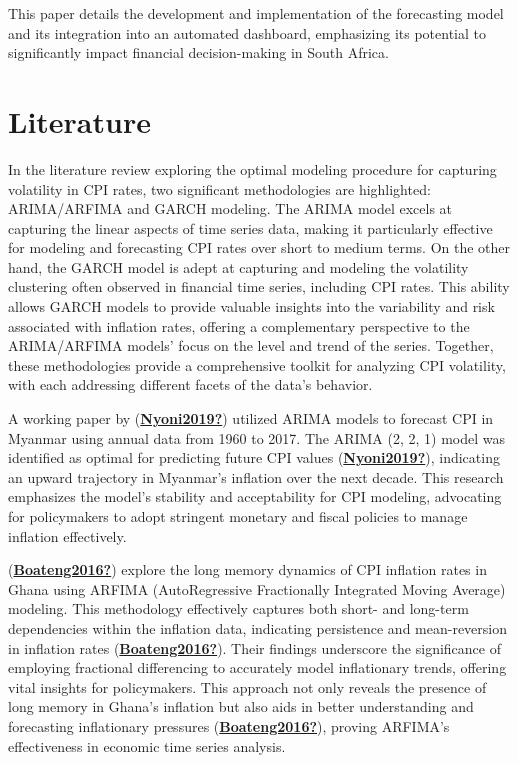 \documentclass[11pt,preprint, authoryear]{elsarticle}
\numberwithin{equation}{section}
\numberwithin{figure}{section}
\numberwithin{table}{section}
\begin{document}
This paper details the development and implementation of the forecasting
model and its integration into an automated dashboard, emphasizing its
potential to significantly impact financial decision-making in South
Africa.

\hypertarget{literature}{%
\section{\texorpdfstring{Literature
\label{Lit}}{Literature }}\label{literature}}

In the literature review exploring the optimal modeling procedure for
capturing volatility in CPI rates, two significant methodologies are
highlighted: ARIMA/ARFIMA and GARCH modeling. The ARIMA model excels at
capturing the linear aspects of time series data, making it particularly
effective for modeling and forecasting CPI rates over short to medium
terms. On the other hand, the GARCH model is adept at capturing and
modeling the volatility clustering often observed in financial time
series, including CPI rates. This ability allows GARCH models to provide
valuable insights into the variability and risk associated with
inflation rates, offering a complementary perspective to the
ARIMA/ARFIMA models' focus on the level and trend of the series.
Together, these methodologies provide a comprehensive toolkit for
analyzing CPI volatility, with each addressing different facets of the
data's behavior.

A working paper by
(\protect\hyperlink{ref-Nyoni2019}{\textbf{Nyoni2019?}}) utilized ARIMA
models to forecast CPI in Myanmar using annual data from 1960 to 2017.
The ARIMA (2, 2, 1) model was identified as optimal for predicting
future CPI values
(\protect\hyperlink{ref-Nyoni2019}{\textbf{Nyoni2019?}}), indicating an
upward trajectory in Myanmar's inflation over the next decade. This
research emphasizes the model's stability and acceptability for CPI
modeling, advocating for policymakers to adopt stringent monetary and
fiscal policies to manage inflation effectively.

(\protect\hyperlink{ref-Boateng2016}{\textbf{Boateng2016?}}) explore the
long memory dynamics of CPI inflation rates in Ghana using ARFIMA
(AutoRegressive Fractionally Integrated Moving Average) modeling. This
methodology effectively captures both short- and long-term dependencies
within the inflation data, indicating persistence and mean-reversion in
inflation rates
(\protect\hyperlink{ref-Boateng2016}{\textbf{Boateng2016?}}). Their
findings underscore the significance of employing fractional
differencing to accurately model inflationary trends, offering vital
insights for policymakers. This approach not only reveals the presence
of long memory in Ghana's inflation but also aids in better
understanding and forecasting inflationary pressures
(\protect\hyperlink{ref-Boateng2016}{\textbf{Boateng2016?}}), proving
ARFIMA's effectiveness in economic time series analysis.
\end{document}
